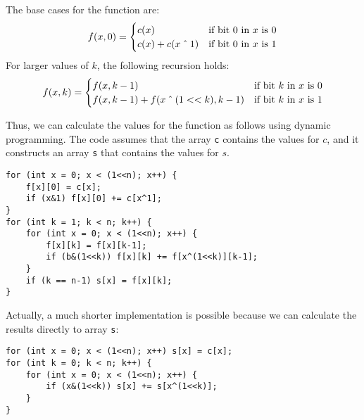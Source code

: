 The base cases for the function are:
\begin{equation*}
    f(x,0) = \begin{cases}
               c(x)          & \textrm{if bit 0 in $x$ is 0}\\
               c(x)+c(x \XOR 1) & \textrm{if bit 0 in $x$ is 1}\\
           \end{cases}
\end{equation*}
For larger values of $k$, the following recursion holds:
\begin{equation*}
    f(x,k) = \begin{cases}
               f(x,k-1)          & \textrm{if bit $k$ in $x$ is 0}\\
               f(x,k-1)+f(x \XOR (1 < < k),k-1)    & \textrm{if bit $k$ in $x$ is 1}\\
           \end{cases}
\end{equation*}

Thus, we can calculate the values for the function
as follows using dynamic programming.
The code assumes that the array \texttt{c}
contains the values for $c$,
and it constructs an array \texttt{s}
that contains the values for $s$.
\begin{lstlisting}
for (int x = 0; x < (1<<n); x++) {
    f[x][0] = c[x];
    if (x&1) f[x][0] += c[x^1];
}
for (int k = 1; k < n; k++) {
    for (int x = 0; x < (1<<n); x++) {
        f[x][k] = f[x][k-1];
        if (b&(1<<k)) f[x][k] += f[x^(1<<k)][k-1];
    }
    if (k == n-1) s[x] = f[x][k];
}
\end{lstlisting}

Actually, a much shorter implementation is possible
because we can calculate the results directly
to array \texttt{s}:
\begin{lstlisting}
for (int x = 0; x < (1<<n); x++) s[x] = c[x];
for (int k = 0; k < n; k++) {
    for (int x = 0; x < (1<<n); x++) {
        if (x&(1<<k)) s[x] += s[x^(1<<k)];
    }
}
\end{lstlisting}

